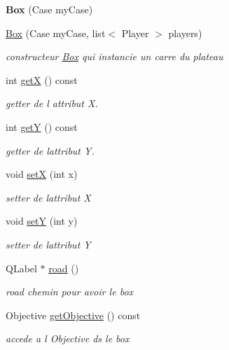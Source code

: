\begin{DoxyCompactItemize}
\item 
\mbox{\label{class_box_a931e030af8e5656ba81ab96d72854640}} 
{\bfseries Box} (Case my\+Case)
\item 
\mbox{\hyperlink{class_box_ab32e4641d7318dcb3d50779a8089f52e}{Box}} (Case my\+Case, list$<$ Player $>$ players)
\begin{DoxyCompactList}\small\item\em constructeur \mbox{\hyperlink{class_box}{Box}} qui instancie un carre du plateau \end{DoxyCompactList}\item 
int \mbox{\hyperlink{class_box_a253cf157c61db2ca9222d29324387b22}{getX}} () const
\begin{DoxyCompactList}\small\item\em getter de l attribut X. \end{DoxyCompactList}\item 
int \mbox{\hyperlink{class_box_a642cd5e8f8d52529f23df56b9e8acb87}{getY}} () const
\begin{DoxyCompactList}\small\item\em getter de l\textquotesingle{}attribut Y. \end{DoxyCompactList}\item 
void \mbox{\hyperlink{class_box_acd61860cf06c9bad6af1b14f30cd1897}{setX}} (int x)
\begin{DoxyCompactList}\small\item\em setter de l\textquotesingle{}attribut X \end{DoxyCompactList}\item 
void \mbox{\hyperlink{class_box_a35db410e0b63daf638f5d9b43d8aaa59}{setY}} (int y)
\begin{DoxyCompactList}\small\item\em setter de l\textquotesingle{}attribut Y \end{DoxyCompactList}\item 
Q\+Label $\ast$ \mbox{\hyperlink{class_box_aaae920c6f391a06e38e781297ec0b204}{road}} ()
\begin{DoxyCompactList}\small\item\em road chemin pour avoir le box \end{DoxyCompactList}\item 
Objective \mbox{\hyperlink{class_box_a84a5d7227a3ecf4e5d207485b21ff904}{get\+Objective}} () const
\begin{DoxyCompactList}\small\item\em accede a l Objective ds le box \end{DoxyCompactList}\item 

\end{DoxyCompactItemize}
